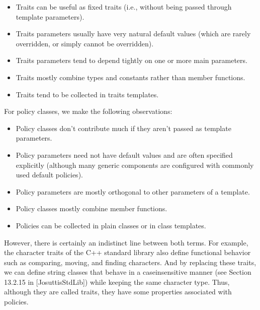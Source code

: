 \begin{itemize}
\item 
Traits can be useful as fixed traits (i.e., without being passed through template parameters).

\item 
Traits parameters usually have very natural default values (which are rarely overridden, or simply cannot be overridden).

\item 
Traits parameters tend to depend tightly on one or more main parameters.

\item 
Traits mostly combine types and constants rather than member functions.

\item 
Traits tend to be collected in traits templates.
\end{itemize}

For policy classes, we make the following observations:

\begin{itemize}
\item 
Policy classes don’t contribute much if they aren’t passed as template parameters.

\item 
Policy parameters need not have default values and are often specified explicitly (although many generic components are configured with commonly used default policies).

\item 
Policy parameters are mostly orthogonal to other parameters of a template.

\item 
Policy classes mostly combine member functions.

\item 
Policies can be collected in plain classes or in class templates.
\end{itemize}

However, there is certainly an indistinct line between both terms. For example, the character traits of the C++ standard library also define functional behavior such as comparing, moving, and finding characters. And by replacing these traits, we can define string classes that behave in a caseinsensitive manner (see Section 13.2.15 in [JosuttisStdLib]) while keeping the same character type. Thus, although they are called traits, they have some properties associated with policies.


